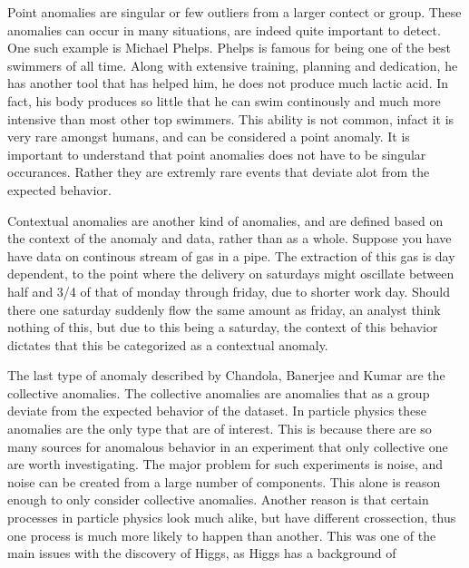 Point anomalies are singular or few outliers from a larger contect or group. These anomalies can occur in many situations, are 
indeed quite important to detect. One such example is Michael Phelps. Phelps is famous for being one of the best swimmers of all time. 
Along with extensive training, planning and dedication, he has another tool that has helped him, he does not produce much lactic acid. 
In fact, his body produces so little that he can swim continously and much more intensive than most other top swimmers. This ability 
is not common, infact it is very rare amongst humans, and can be considered a point anomaly. It is important to understand that point anomalies
does not have to be singular occurances. Rather they are extremly rare events that deviate alot from the expected behavior. \par
Contextual anomalies are another kind of anomalies, and are defined based on the context of the anomaly and data, rather than as a whole. 
Suppose you have have data on continous stream of gas in a pipe. The extraction of this gas is day dependent, to the point where the delivery 
on saturdays might oscillate between half and 3/4 of that of monday through friday, due to shorter work day. Should there one saturday 
suddenly flow the same amount as friday, an analyst think nothing of this, but due to this being a saturday, the context of this behavior 
dictates that this be categorized as a contextual anomaly. \par 
The last type of anomaly described by Chandola, Banerjee and Kumar \cite{anom_detec} are the collective anomalies. The collective anomalies 
are anomalies that as a group deviate from the expected behavior of the dataset. In particle physics these anomalies are the only type that 
are of interest. This is because there are so many sources for anomalous behavior in an experiment that only collective one are worth investigating. 
The major problem for such experiments is noise, and noise can be created from a large number of components. This alone is reason enough to 
only consider collective anomalies. Another reason is that certain processes in particle physics look much alike, but have different crossection,
thus one process is much more likely to happen than another. This was one of the main issues with the discovery of Higgs, as Higgs has a background 
of 
